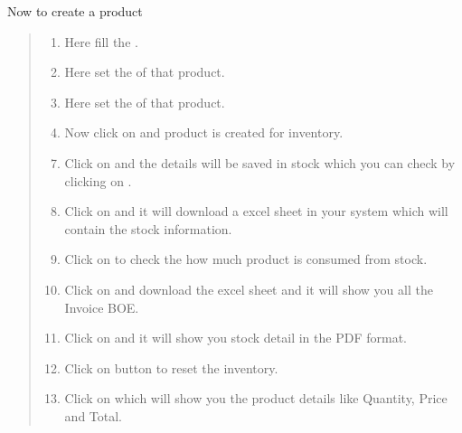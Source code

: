 \documentclass[letterpaper,10pt,english]{sphinxmanual}
\begin{document}
\begin{figure}[htbp]
\centering

\noindent{}
\end{figure}

Now to create a product
\begin{quote}
\begin{enumerate}
\item {} 
Here fill the  .

\item {} 
Here set the  of that product.

\item {} 
Here set the  of that product.

\item {} 
Now click on  and product is created for inventory.

\end{enumerate}
\begin{enumerate}
\setcounter{enumi}{6}
\item {} 
Click on  and the details will be saved in stock which you can check by clicking on  .

\item {} 
Click on  and it will download a excel sheet in your system which will contain the stock information.

\item {} 
Click on  to check the how much product is consumed from stock.

\item {} 
Click on  and download the excel sheet and it will show you all the Invoice BOE.

\item {} 
Click on  and it will show you stock detail in the PDF format.

\item {} 
Click on  button to reset the inventory.

\item {} 
Click on  which will show you the product details like Quantity, Price and Total.

\end{enumerate}
\end{quote}
\end{document}
